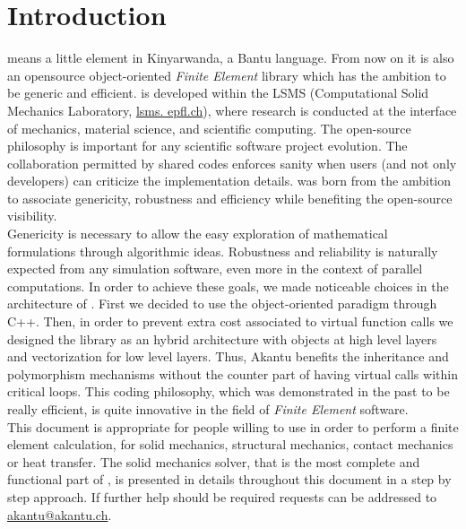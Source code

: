 \chapter{Introduction}

\akantu means a little element in Kinyarwanda, a
Bantu language. From now on it is also an opensource
object-oriented \textit{Finite Element} library which has the ambition
to be generic and efficient.
\akantu is developed within the LSMS (Computational Solid Mechanics Laboratory, \url{lsms.
epfl.ch}), where research is conducted at the interface of mechanics, material
science, and scientific computing. 
The open-source philosophy is important for any
scientific software project evolution. The collaboration
permitted by shared codes enforces sanity when users (and not
only developers) can criticize the implementation details.
\akantu was born from the ambition to associate genericity, robustness 
and efficiency while benefiting the open-source visibility.\\

Genericity is necessary to allow the easy exploration of mathematical
formulations through algorithmic ideas. Robustness and reliability
is naturally expected from any simulation software, even more 
in the context of parallel computations. 
In order to achieve these goals, we made noticeable choices in
the architecture of \akantu. First we decided to use the object-oriented
paradigm through C++. Then, in order to prevent extra cost associated 
to virtual function calls we designed the library as
an hybrid architecture with objects at high level layers and
vectorization for low level layers. Thus, Akantu benefits the
inheritance and polymorphism mechanisms without the counter
part of having virtual calls within critical loops. 
This coding philosophy, which was demonstrated in the past to be really 
efficient, is quite innovative in the field of \textit{Finite Element} software. \\

This document is appropriate for people willing to use \akantu
in order to perform a finite element calculation, for solid mechanics,
structural mechanics, contact mechanics or heat transfer. The solid mechanics solver, that is the most 
complete and functional part of \akantu, is presented in details throughout 
this document in a step by step approach. If further help should be required 
requests can be addressed to \href{mailto:akantu@akantu.ch}{akantu@akantu.ch}. 


